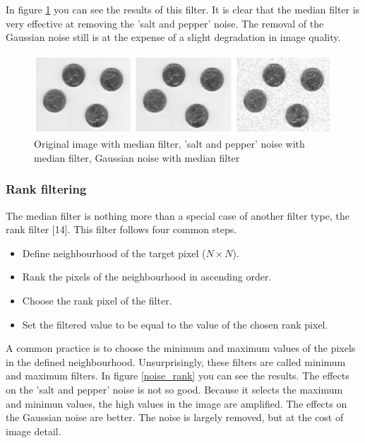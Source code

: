 \documentclass[12pt]{article}
\begin{document}
In figure \ref{noise_median} you can see the results of this filter. It is clear that the median filter is very effective at removing the 'salt and pepper' noise. The removal of the Gaussian noise still is at the expense of a slight degradation in image quality. 

\begin{figure}[H]
\hspace*{-1.7cm}
\centering
\includegraphics[scale = 0.9]{img/noise_median}
\caption{Original image with median filter, 'salt and pepper' noise with median filter, Gaussian noise with median filter}
\label{noise_median}
\end{figure}

\subsubsection{Rank filtering}

The median filter is nothing more than a special case of another filter type, the rank filter [14]. This filter follows four common steps.

\begin{itemize}
\item Define neighbourhood of the target pixel ($N\times N$).
\item Rank the pixels of the neighbourhood in ascending order.
\item Choose the rank pixel of the filter.
\item Set the filtered value to be equal to the value of the chosen rank pixel.
\end{itemize}

A common practice is to choose the minimum and maximum values of the pixels in the defined neighbourhood. Unsurprisingly, these filters are called minimum and maximum filters. In figure \ref{noise_rank} you can see the results. The effects on the 'salt and pepper' noise is not so good. Because it selects the maximum and minimun values, the high values in the image are amplified. The effects on the Gaussian noise are better. The noise is largely removed, but at the cost of image detail.
\end{document}
